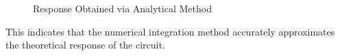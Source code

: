 \begin{multicols}{2}
\begin{figure}[H]
  \caption{Response Obtained via Analytical Method}
\end{figure}
This indicates that the numerical integration method accurately approximates the theoretical response of the circuit.

\end{multicols}

